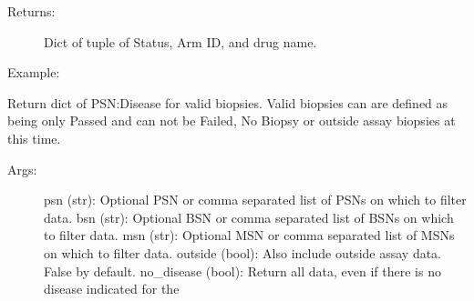 \documentclass[letterpaper,10pt,english]{sphinxmanual}
\begin{document}
\begin{fulllineitems}
\begin{fulllineitems}
\begin{description}
\item[{Returns:}] \leavevmode
Dict of tuple of Status, Arm ID, and drug name.

\item[{Example:}] \leavevmode
\begin{sphinxVerbatim}[commandchars=\\\{\}]
\end{sphinxVerbatim}

\begin{sphinxVerbatim}[commandchars=\\\{\}]
\end{sphinxVerbatim}

\end{description}

\end{fulllineitems}


\begin{fulllineitems}
\label{\detokenize{matchbox_api_utils:matchbox_api_utils.MatchData.get_patients_and_disease}}
Return dict of PSN:Disease for valid biopsies.  Valid biopsies can
are defined as being only Passed and can not be Failed, No Biopsy or
outside assay biopsies at this time.
\begin{description}
\item[{Args:}] \leavevmode
psn (str): Optional PSN or comma separated list of PSNs on which to filter data.
bsn (str): Optional BSN or comma separated list of BSNs on which to filter data.
msn (str): Optional MSN or comma separated list of MSNs on which to filter data.
outside (bool): Also include outside assay data. False by default.
no\_disease (bool): Return all data, even if there is no disease indicated for the
\begin{quote}


\end{quote}
\end{description}
\end{fulllineitems}
\end{fulllineitems}
\end{document}

